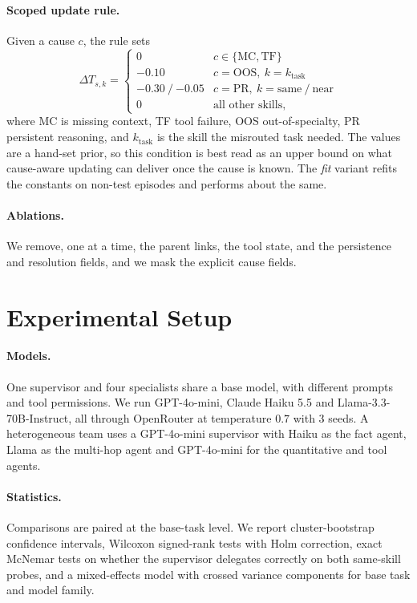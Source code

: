 \documentclass[letterpaper]{article}
\newcommand{\dT}{\Delta T}
\begin{document}
\paragraph{Scoped update rule.}
Given a cause $c$, the rule sets
\begin{equation}
\dT_{s,k}=\begin{cases}
0 & c\in\{\mathrm{MC},\mathrm{TF}\}\\[2pt]
-0.10 & c=\mathrm{OOS},\ k=k_{\text{task}}\\[2pt]
-0.30\ /\ {-0.05} & c=\mathrm{PR},\ k=\text{same}\ /\ \text{near}\\[2pt]
0 & \text{all other skills,}
\end{cases}
\end{equation}
where MC is missing context, TF tool failure, OOS out-of-specialty, PR persistent reasoning, and $k_{\text{task}}$ is the skill the misrouted task needed.
The values are a hand-set prior, so this condition is best read as an upper bound on what cause-aware updating can deliver once the cause is known. The \emph{fit} variant refits the constants on non-test episodes and performs about the same.


\paragraph{Ablations.}
We remove, one at a time, the parent links, the tool state, and the persistence and resolution fields, and we mask the explicit cause fields.

\section{Experimental Setup}
\paragraph{Models.}
One supervisor and four specialists share a base model, with different prompts and tool permissions. We run GPT-4o-mini, Claude Haiku 5.5 and Llama-3.3-70B-Instruct, all through OpenRouter at temperature $0.7$ with $3$ seeds. A heterogeneous team uses a GPT-4o-mini supervisor with Haiku as the fact agent, Llama as the multi-hop agent and GPT-4o-mini for the quantitative and tool agents.

\paragraph{Statistics.}
Comparisons are paired at the base-task level. We report cluster-bootstrap confidence intervals, Wilcoxon signed-rank tests with Holm correction, exact McNemar tests on whether the supervisor delegates correctly on both same-skill probes, and a mixed-effects model with crossed variance components for base task and model family.
\end{document}
